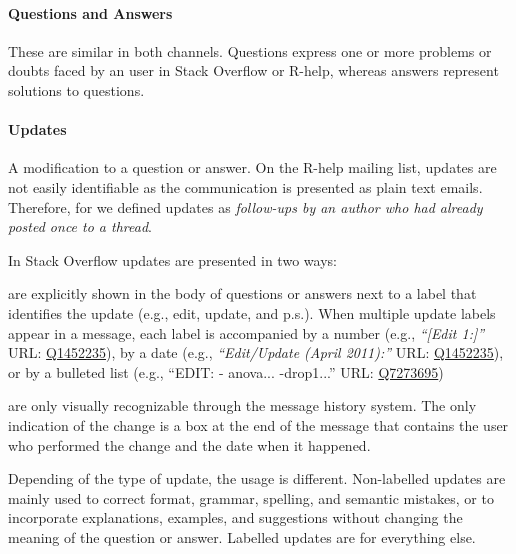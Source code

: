 \begin{table}[!htb]
\begin{small}
\begin{tabular}[h]{p{2.3cm}p{10.3cm}rrrrr}
        \end{tabular}
      \end{small}
      \label{table:type-of-knowledge}
    \end{table}



\paragraph*{Questions and Answers}
    These are similar in both channels. Questions express one or more problems or doubts faced by an user in Stack Overflow or R-help, whereas answers represent solutions to questions.

\paragraph*{Updates}
	A modification to a question or answer.
	On the R-help mailing list, updates are not easily identifiable as the communication is presented as plain text emails.
	Therefore, for \RH we defined updates  as \emph{follow-ups by an author who had already posted once to a thread}.

	In Stack Overflow updates are presented in two ways:
	\begin{description}[itemsep=3pt, topsep=2pt, leftmargin=3em, parsep=0pt]
		\item[Labelled updates] are explicitly shown in the body of questions or answers next to a label that identifies the update (e.g., edit, update, and p.s.).
		When multiple update labels appear in a message, each label is accompanied by a number (e.g., \textit{``[Edit 1:]''} {\footnotesize URL:  \href{http://goo.gl/ptYAG0}{Q1452235}}), by a date (e.g., \textit{``Edit/Update (April 2011):''} {\footnotesize URL:  \href{http://goo.gl/ptYAG0}{Q1452235}}), or by a bulleted list (e.g., ``EDIT: - anova... -drop1...'' {\footnotesize URL:  \href{http://goo.gl/sQiq0M}{Q7273695}})

		\item[Non-labelled updates] are only visually recognizable through the message history system. The only indication of the change is a box at the end of the message that contains the user who performed the change and the date when it happened.
	\end{description}

	Depending of the type of update, the usage is different.
	Non-labelled updates are mainly used to correct format, grammar, spelling, and semantic mistakes, or to incorporate explanations, examples, and suggestions without changing the meaning of the question or answer. Labelled updates are for everything else.


